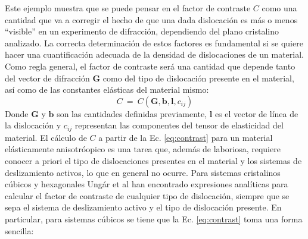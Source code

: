 Este ejemplo muestra que se puede pensar en el factor de contraste $C$ como una cantidad que va a corregir el hecho de que una dada dislocación es más o menos ``visible'' en un experimento de difracción, dependiendo del plano cristalino analizado.
La correcta determinación de estos factores es fundamental si se quiere hacer una cuantificación adecuada de la densidad de dislocaciones de un material.
Como regla general, el factor de contraste será una cantidad que depende tanto del vector de difracción $\mathbf{G}$ como del tipo de dislocación presente en el material, así como de las constantes elásticas del material mismo:
\begin{equation}
  C \ = \ C(\mathbf{G},\mathbf{b},\mathbf{l},c_{ij})
  \label{eq:contrast}
\end{equation}
\noindent
Donde $\mathbf{G}$ y $\mathbf{b}$ son las cantidades definidas previamente, $\mathbf{l}$ es el vector de línea de la dislocación y $c_{ij}$ representan las componentes del tensor de elasticidad del material.
El cálculo de $C$ a partir de la Ec. \ref{eq:contrast} para un material elásticamente anisotróopico es una tarea que, además de laboriosa, requiere conocer a priori el tipo de dislocaciones presentes en el material y los sistemas de deslizamiento activos, lo que en general no ocurre.
Para sistemas cristalinos cúbicos y hexagonales Ungár et al\cite{Dragomir1999,Dragomir2002} han encontrado expresiones analíticas para calcular el factor de contraste de cualquier tipo de dislocación, siempre que se sepa el sistema de deslizamiento activo y el tipo de dislocación presente. En particular, para sistemas cúbicos se tiene que la Ec. \ref{eq:contrast} toma una forma sencilla:

